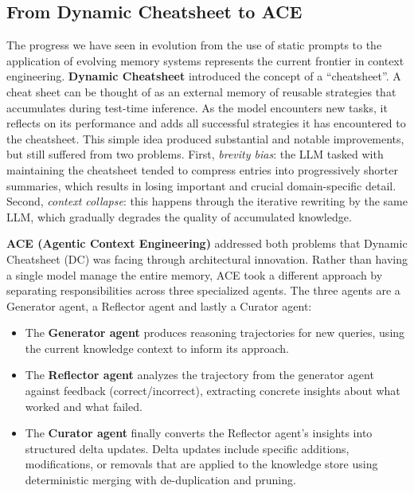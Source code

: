 \documentclass[12pt,a4paper,oneside]{article}
\begin{document}
\subsection{From Dynamic Cheatsheet to ACE}

The progress we have seen in evolution from the use of static prompts to the application of evolving memory systems represents the current frontier in context engineering. \textbf{Dynamic Cheatsheet} \citep{suzgun2025dynamic} introduced the concept of a ``cheatsheet''. A cheat sheet can be thought of as an external memory of reusable strategies that accumulates during test-time inference. As the model encounters new tasks, it reflects on its performance and adds all successful strategies it has encountered to the cheatsheet. This simple idea produced substantial and notable improvements, but still suffered from two problems. First, \textit{brevity bias}: the LLM tasked with maintaining the cheatsheet tended to compress entries into progressively shorter summaries, which results in losing important and crucial domain-specific detail. Second, \textit{context collapse}: this happens through the iterative rewriting by the same LLM, which gradually degrades the quality of accumulated knowledge.

\textbf{ACE (Agentic Context Engineering)} \citep{ace2025} addressed both problems that Dynamic Cheatsheet (DC) was facing through architectural innovation. Rather than having a single model manage the entire memory, ACE took a different approach by separating responsibilities across three specialized agents. The three agents are a Generator agent, a Reflector agent and lastly a Curator agent:

\begin{itemize}[leftmargin=*]
\item The \textbf{Generator agent} produces reasoning trajectories for new queries, using the current knowledge context to inform its approach.
\item The \textbf{Reflector agent} analyzes the trajectory from the generator agent against feedback (correct/incorrect), extracting concrete insights about what worked and what failed.
\item The \textbf{Curator agent} finally converts the Reflector agent's insights into structured delta updates. Delta updates include specific additions, modifications, or removals that are applied to the knowledge store using deterministic merging with de-duplication and pruning.
\end{itemize}
\end{document}
